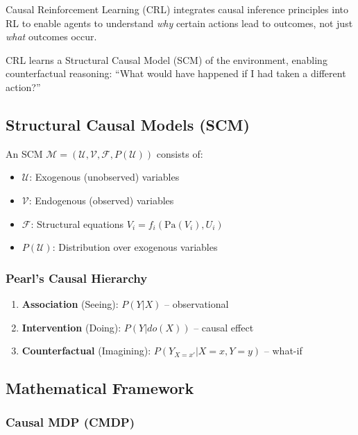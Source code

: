 \documentclass[11pt,a4paper]{article}
\begin{document}
Causal Reinforcement Learning (CRL) integrates causal inference principles into RL to enable agents to understand \textit{why} certain actions lead to outcomes, not just \textit{what} outcomes occur.

\begin{crlbox}
CRL learns a Structural Causal Model (SCM) of the environment, enabling counterfactual reasoning: ``What would have happened if I had taken a different action?''
\end{crlbox}

\subsection{Structural Causal Models (SCM)}

An SCM $\mathcal{M} = (\mathcal{U}, \mathcal{V}, \mathcal{F}, P(\mathcal{U}))$ consists of:
\begin{itemize}
  \item $\mathcal{U}$: Exogenous (unobserved) variables
  \item $\mathcal{V}$: Endogenous (observed) variables
  \item $\mathcal{F}$: Structural equations $V_i = f_i(\text{Pa}(V_i), U_i)$
  \item $P(\mathcal{U})$: Distribution over exogenous variables
\end{itemize}

\subsubsection{Pearl's Causal Hierarchy}

\begin{enumerate}
  \item \textbf{Association} (Seeing): $P(Y|X)$ -- observational
  \item \textbf{Intervention} (Doing): $P(Y|do(X))$ -- causal effect
  \item \textbf{Counterfactual} (Imagining): $P(Y_{X=x'}|X=x, Y=y)$ -- what-if
\end{enumerate}

\subsection{Mathematical Framework}

\subsubsection{Causal MDP (CMDP)}
\end{document}
